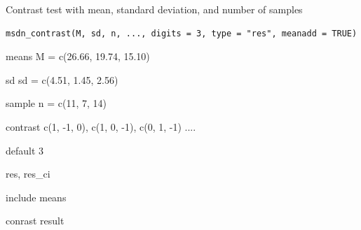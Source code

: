 \documentclass[a4paper]{book}
\begin{document}
%
\begin{Description}
Contrast test with mean, standard deviation, and number of samples
\end{Description}
%
\begin{Usage}
\begin{verbatim}
msdn_contrast(M, sd, n, ..., digits = 3, type = "res", meanadd = TRUE)
\end{verbatim}
\end{Usage}
%
\begin{Arguments}
\begin{ldescription}
\item[\code{M}] means M = c(26.66, 19.74, 15.10)

\item[\code{sd}] sd  sd = c(4.51, 1.45, 2.56)

\item[\code{n}] sample  n = c(11, 7, 14)

\item[\code{...}] contrast c(1, -1,  0), c(1,  0, -1), c(0,  1, -1) ....

\item[\code{digits}] default 3

\item[\code{type}] res, res\_ci

\item[\code{meanadd}] include means
\end{ldescription}
\end{Arguments}
%
\begin{Value}
conrast result
\end{Value}
%
\end{document}
